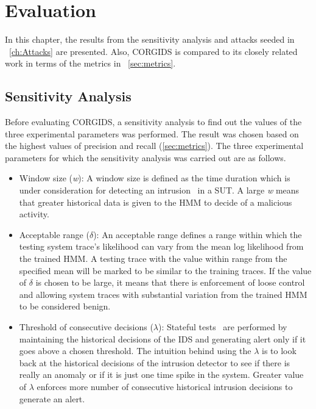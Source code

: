
\chapter{\textbf{Evaluation}}
\label{sec6:Evaluation}
In this chapter, the results from the sensitivity analysis and attacks seeded in ~\autoref{ch:Attacks} are presented. Also, \ac{CORGIDS} is compared to its closely related work in terms of the metrics in ~\autoref{sec:metrics}.

\section{Sensitivity Analysis}
\label{sensitivityAnalysis}

Before evaluating \ac{CORGIDS}, a sensitivity analysis to find out the values of the three experimental parameters was performed. The result was chosen based on the highest values of precision and recall (\autoref{sec:metrics}). The three experimental parameters for which the sensitivity analysis was carried out are as follows.
\begin{itemize}
\item Window size (\textit{w}): A window size is defined as the time duration which is under consideration for detecting an intrusion~\cite{zohrevand2016hidden} in a \ac{SUT}. A large \textit{w} means that greater historical data is given to the \ac{HMM} to decide of a malicious activity.
\item Acceptable range ($\delta$): An acceptable range defines a range within which the testing system trace's likelihood can vary from the mean log likelihood from the trained \ac{HMM}. A testing trace with the value within range from the specified mean will be marked to be similar to the training traces. If the value of $\delta$ is chosen to be large, it means that there is enforcement of loose control and allowing system traces with substantial variation from the trained \ac{HMM} to be considered benign.
\item Threshold of consecutive decisions ($\lambda$): Stateful tests~\cite{urbina2016limiting} are performed by maintaining the historical decisions of the \ac{IDS} and generating alert only if it goes above a chosen threshold. The intuition behind using the $\lambda$ is to look back at the historical decisions of the intrusion detector to see if there is really an anomaly or if it is just one time spike in the system. Greater value of $\lambda$ enforces more number of consecutive historical intrusion decisions to generate an alert.
\end{itemize}

